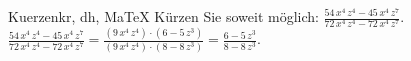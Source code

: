 \begin{MAufgabe}{Kuerzen}{kr, dh, MaTeX}
K\"urzen Sie soweit m\"oglich: $\frac{54\, x^4\, z^4 - 45\, x^4\, z^7}{72\, x^4\, z^4 - 72\, x^4\, z^7}$.\\ 
\ifLsg\MLoesung
\quad $\frac{54\, x^4\, z^4 - 45\, x^4\, z^7}{72\, x^4\, z^4 - 72\, x^4\, z^7}=\frac{(9\, x^4\, z^4)\cdot(6 - 5\, z^3)}{(9\, x^4\, z^4)\cdot(8 - 8\, z^3)}=\frac{6 - 5\, z^3}{8 - 8\, z^3}$.\else\relax\fi
 \end{MAufgabe}